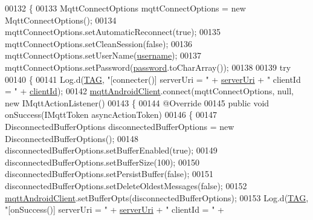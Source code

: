\begin{DoxyCode}
00132     \{
00133         MqttConnectOptions mqttConnectOptions = \textcolor{keyword}{new} MqttConnectOptions();
00134         mqttConnectOptions.setAutomaticReconnect(\textcolor{keyword}{true});
00135         mqttConnectOptions.setCleanSession(\textcolor{keyword}{false});
00136         mqttConnectOptions.setUserName(\hyperlink{classcom_1_1example_1_1bee__honeyt_1_1_communication_abfc9c112404b1ddf0fa90587201d5a8f}{username});
00137         mqttConnectOptions.setPassword(\hyperlink{classcom_1_1example_1_1bee__honeyt_1_1_communication_ace9fdd48d010e4c43cb5d32767207cae}{password}.toCharArray());
00138 
00139         \textcolor{keywordflow}{try}
00140         \{
00141             Log.d(\hyperlink{classcom_1_1example_1_1bee__honeyt_1_1_communication_a848338dd9654af654c7e681742666785}{TAG}, \textcolor{stringliteral}{"[connecter()] serverUri = "} + \hyperlink{classcom_1_1example_1_1bee__honeyt_1_1_communication_a19b957478f8d8a0d8319e8459d85862e}{serverUri} + \textcolor{stringliteral}{" clientId = "} + 
      \hyperlink{classcom_1_1example_1_1bee__honeyt_1_1_communication_a8b44e0173d57396d5478f767723c23cc}{clientId});
00142             \hyperlink{classcom_1_1example_1_1bee__honeyt_1_1_communication_a86db63a356e4638c1d39c54bbe64f0e1}{mqttAndroidClient}.connect(mqttConnectOptions, null, \textcolor{keyword}{new} IMqttActionListener()
00143             \{
00144                 @Override
00145                 \textcolor{keyword}{public} \textcolor{keywordtype}{void} onSuccess(IMqttToken asyncActionToken)
00146                 \{
00147                     DisconnectedBufferOptions disconnectedBufferOptions = \textcolor{keyword}{new} DisconnectedBufferOptions();
00148                     disconnectedBufferOptions.setBufferEnabled(\textcolor{keyword}{true});
00149                     disconnectedBufferOptions.setBufferSize(100);
00150                     disconnectedBufferOptions.setPersistBuffer(\textcolor{keyword}{false});
00151                     disconnectedBufferOptions.setDeleteOldestMessages(\textcolor{keyword}{false});
00152                     \hyperlink{classcom_1_1example_1_1bee__honeyt_1_1_communication_a86db63a356e4638c1d39c54bbe64f0e1}{mqttAndroidClient}.setBufferOpts(disconnectedBufferOptions);
00153                     Log.d(\hyperlink{classcom_1_1example_1_1bee__honeyt_1_1_communication_a848338dd9654af654c7e681742666785}{TAG}, \textcolor{stringliteral}{"[onSuccess()] serverUri = "} + \hyperlink{classcom_1_1example_1_1bee__honeyt_1_1_communication_a19b957478f8d8a0d8319e8459d85862e}{serverUri} + \textcolor{stringliteral}{" clientId = "} + 

\end{DoxyCode}
